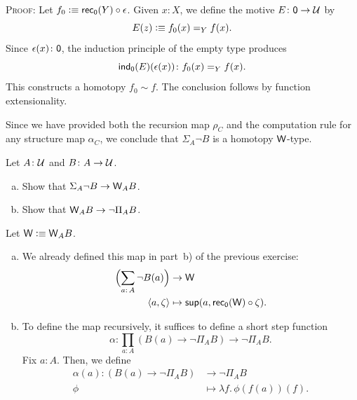\begin{solution}
\begin{enumerate}[a)]
        \textsc{Proof:}
            Let $f_0\mathrel{\vcentcolon}\equiv\mathsf{rec}_{\mathsf{0}}(Y)\circ\epsilon$. Given $x\colon X$, we define the motive $E\colon\fun0\to\univ$ by
            \[
                E(z)\mathrel{\vcentcolon}\equiv f_0(x)\mathrel{=_{Y}} f(x).
            \]
            Since $\epsilon(x)\colon\fun0$, the induction principle of the empty type produces
            \[
                \fun{ind}_{\fun0}(E)(\epsilon(x))
                    \colon f_0(x)\eq Y f(x).
            \]
            This constructs a homotopy $f_0\sim f$. The conclusion follows by function extensionality.\localqed

        \bigskip

        Since we have provided both the recursion map $\rho_C$ and the computation rule for any structure map $\alpha_C$, we conclude that $\Sigma_A\neg B$ is a homotopy $\mathsf{W}$-type.
    \end{enumerate}
\end{solution}

\begin{exr}\label{exr:Sigma-to-W-and-W-to-Pi}
    Let\/ $A\colon\univ$ and\/ $B\colon A\to\univ$.
    \begin{enumerate}[a),font=\upshape]
        \item Show that\/ $\Sigma_A\neg B\to\mathsf{W}_AB$.
        \item Show that\/ $\mathsf{W}_AB\to\neg\Pi_AB$.
    \end{enumerate}
\end{exr}

\begin{solution}Let $\mathsf{W}\mathrel{\vcentcolon}\equiv\mathsf{W}_AB$.
    \begin{enumerate}[a)]
        \item We already defined this map in part~b) of the previous exercise:
        \begin{align*}
            \Bigl(
                \sum_{a\colon A}\neg B(a)
            \Bigr)
                &\to\fun W\\
            \dep{a,\zeta}
                &\mapsto
                    \fun{sup}
                        (
                            a,
                            \fun{rec}_{\fun0}(\fun W)\circ\zeta
                        ).
        \end{align*}

        \item To define the map recursively, it suffices to define a short step function
        \[
            \alpha\colon\prod_{a\colon A}
                (B(a)\to\neg\Pi_AB)
                \to\neg\Pi_AB.
        \]
        Fix $a\colon A$. Then, we define
        \begin{align*}
            \alpha(a)\colon(B(a)\to\neg\Pi_AB)&\to\neg\Pi_AB\\
            \phi&\mapsto\lambda f.\,\phi(f(a))(f).
        \end{align*}
        
    \end{enumerate}
\end{solution}

